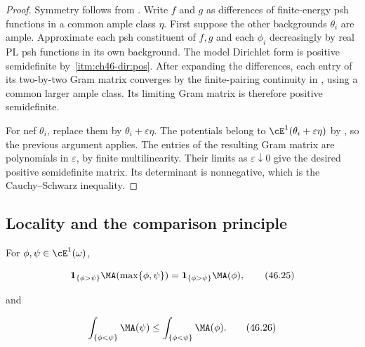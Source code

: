 \begin{proof}
Symmetry follows from .
Write $f$ and $g$ as differences of finite-energy psh functions in a
common ample class $\eta$.
First suppose the other backgrounds $\theta_i$ are ample.
Approximate each psh constituent of $f,g$ and each $\phi_i$
decreasingly by real PL psh functions in its own background.
The model Dirichlet form is positive semidefinite by
\,\cref{itm:ch46-dir:pos}.
After expanding the differences, each entry of its two-by-two Gram
matrix converges by the finite-pairing continuity in
\cite[Theorem~7.14(iii)]{BJ22}, using a common larger ample class.
Its limiting Gram matrix is therefore positive semidefinite.

For nef $\theta_i$, replace them by $\theta_i+\varepsilon\eta$.
The potentials belong to $\cE^1(\theta_i+\varepsilon\eta)$ by
\cite[Lemma~7.13]{BJ22}, so the previous argument applies.
The entries of the resulting Gram matrix are polynomials in
$\varepsilon$, by finite multilinearity.
Their limits as $\varepsilon\downarrow0$ give the desired positive
semidefinite matrix.  Its determinant is nonnegative, which is the
Cauchy--Schwarz inequality.
\end{proof}

\subsection{Locality and the comparison principle}
\label{sec:ch46-locality}

\begin{theorem}\label{thm:bj-locality-comparison}
For $\phi,\psi\in\cE^1(\omega)$,

\[
 \mathbf1_{\{\phi>\psi\}}\MA(\max\{\phi,\psi\})
 =\mathbf1_{\{\phi>\psi\}}\MA(\phi),
\tag{46.25}\label{eq:bj-locality}
\]

and

\[
 \int_{\{\phi<\psi\}}\MA(\psi)
 \leq\int_{\{\phi<\psi\}}\MA(\phi).
\tag{46.26}\label{eq:bj-comparison-principle}
\]
\end{theorem}

